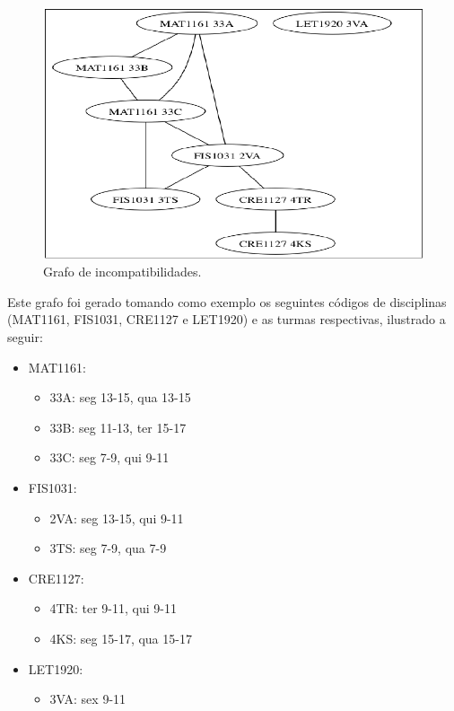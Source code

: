 \documentclass[graduacao,brazil]{ThesisPUC}
\begin{document}
\begin{figure}[H]
    \centering
    \includegraphics[width=\linewidth]{img/independentset.png}
    \caption{Grafo de incompatibilidades.}
\end{figure}

Este grafo foi gerado tomando como exemplo os seguintes códigos de disciplinas (MAT1161, FIS1031, CRE1127 e LET1920) e as turmas respectivas, ilustrado a seguir:

\begin{itemize}
	\item MAT1161:
	\begin{itemize}
		\item 33A: seg 13-15, qua 13-15
		\item 33B: seg 11-13, ter 15-17
		\item 33C: seg 7-9, qui 9-11
	\end{itemize}

	\item FIS1031:
	\begin{itemize}
		\item 2VA: seg 13-15, qui 9-11
		\item 3TS: seg 7-9, qua 7-9
	\end{itemize}

	\item CRE1127:
	\begin{itemize}
		\item 4TR: ter 9-11, qui 9-11
		\item 4KS: seg 15-17, qua 15-17
	\end{itemize}

	\item LET1920:
	\begin{itemize}
		\item 3VA: sex 9-11
	\end{itemize}
\end{itemize}
\end{document}
